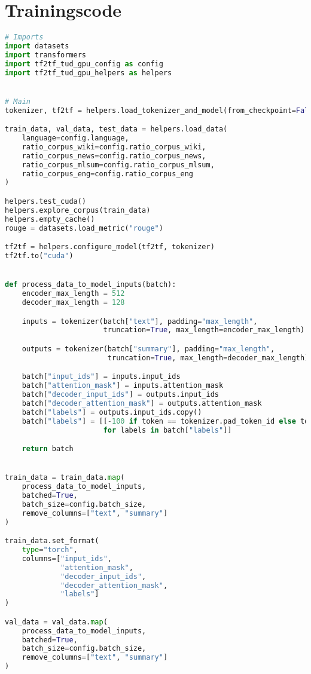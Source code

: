 \section*{Trainingscode}
\begin{lstlisting}[language=Python, caption=Trainingscode]
# Imports
import datasets
import transformers
import tf2tf_tud_gpu_config as config
import tf2tf_tud_gpu_helpers as helpers


# Main
tokenizer, tf2tf = helpers.load_tokenizer_and_model(from_checkpoint=False)

train_data, val_data, test_data = helpers.load_data(
    language=config.language,
    ratio_corpus_wiki=config.ratio_corpus_wiki,
    ratio_corpus_news=config.ratio_corpus_news,
    ratio_corpus_mlsum=config.ratio_corpus_mlsum,
    ratio_corpus_eng=config.ratio_corpus_eng
)

helpers.test_cuda()
helpers.explore_corpus(train_data)
helpers.empty_cache()
rouge = datasets.load_metric("rouge")

tf2tf = helpers.configure_model(tf2tf, tokenizer)
tf2tf.to("cuda")


def process_data_to_model_inputs(batch):
    encoder_max_length = 512
    decoder_max_length = 128

    inputs = tokenizer(batch["text"], padding="max_length",
                       truncation=True, max_length=encoder_max_length)

    outputs = tokenizer(batch["summary"], padding="max_length",
                        truncation=True, max_length=decoder_max_length)

    batch["input_ids"] = inputs.input_ids
    batch["attention_mask"] = inputs.attention_mask
    batch["decoder_input_ids"] = outputs.input_ids
    batch["decoder_attention_mask"] = outputs.attention_mask
    batch["labels"] = outputs.input_ids.copy()
    batch["labels"] = [[-100 if token == tokenizer.pad_token_id else token for token in labels]
                       for labels in batch["labels"]]

    return batch


train_data = train_data.map(
    process_data_to_model_inputs,
    batched=True,
    batch_size=config.batch_size,
    remove_columns=["text", "summary"]
)

train_data.set_format(
    type="torch",
    columns=["input_ids",
             "attention_mask",
             "decoder_input_ids",
             "decoder_attention_mask",
             "labels"]
)

val_data = val_data.map(
    process_data_to_model_inputs,
    batched=True,
    batch_size=config.batch_size,
    remove_columns=["text", "summary"]
)


\end{lstlisting}
